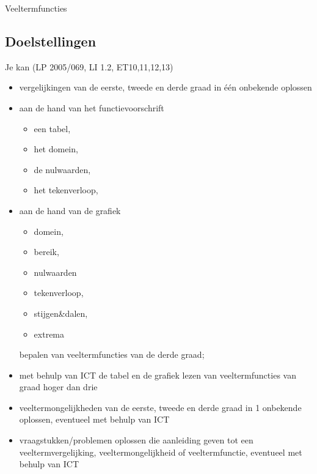 \documentclass[12pt]{article}
\begin{document}
\pagestyle{fancy}
\lhead{}

\begin{theorie}

\thispagestyle{empty}
\begin{center}
  \begin{mdframed}
    \centering
    \fontsize{35}{70}\selectfont Veeltermfuncties
  \end{mdframed}
  \vfill
  \vfill
\end{center}
\vspace*{-2cm}

\subsection*{Doelstellingen}
{\singlespacing
  Je kan \hfill  {\scriptsize(LP 2005/069, LI 1.2, ET10,11,12,13)}
  \begin{itemize}
  \item vergelijkingen van de eerste, tweede en derde graad in één onbekende oplossen
  \item aan de hand van het functievoorschrift
    \begin{itemize}
    \item een tabel,
    \item het domein,
    \item de nulwaarden,
    \item het tekenverloop,
    \end{itemize}
  \item aan de hand van de grafiek
    \begin{itemize}
    \item domein,
    \item bereik,
    \item nulwaarden
    \item tekenverloop,
    \item stijgen\&dalen,
    \item extrema
    \end{itemize}
    bepalen van veeltermfuncties van de derde graad;
  \item met behulp van ICT de tabel en de grafiek lezen van veeltermfuncties van graad hoger dan drie
  \item veeltermongelijkheden van de eerste, tweede en derde graad in 1 onbekende oplossen, eventueel met behulp van ICT
  \item vraagstukken/problemen oplossen die aanleiding geven tot een veeltermvergelijking, veeltermongelijkheid of veeltermfunctie, eventueel met behulp van ICT
  \end{itemize}

}
\thispagestyle{empty}
\mbox{}
\newpage
\clearpage
\thispagestyle{empty}
\tableofcontents
\newpage
\clearpage
{}


\fancyhead[RE,LO]{}

\end{theorie}
\end{document}
